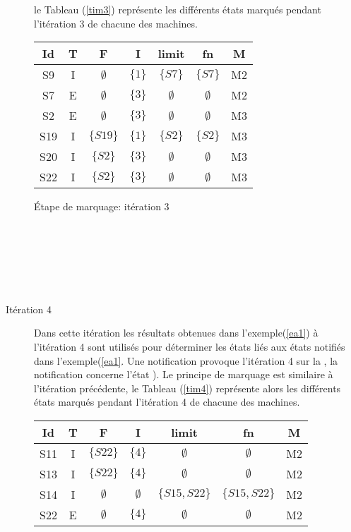 \begin{Exemple}
\begin{description}
le Tableau (\ref{tim3}) représente les différents états marqués pendant l'itération 3 de chacune des machines. 
	\begin{tableth}
	\centering
	\begin{tabular}{|*{7}{c|}}
		\hline
		Id&		T&			F&	I&	limit&	fn&		M\\
		\hline
		S9&	I&	$\emptyset$&	$\{1\}$&	$\{S7\}$   &	$\{S7\}$&	M2\\ \hline
		S7&	E&	$\emptyset$&	$\{3\}$&	$\emptyset$& $\emptyset$&	M2\\ \hline
		S2&	E&	$\emptyset$&	$\{3\}$&$\emptyset$& $\emptyset$	&	M3\\ \hline
		S19&I&	$\{S19\}$&	$\{1\}$&$\{S2\}$   & $\{S2\}$	&	M3\\ \hline
		S20&I&	$\{S2\}$&	$\{3\}$&$\emptyset$& $\emptyset$&	M3\\ \hline
		S22&I&	$\{S2\}$&	$\{3\}$&$\emptyset$& $\emptyset$&	M3\\ \hline
		
	\end{tabular}
	\caption{Étape de marquage: itération 3}\label{tim3}
\end{tableth}
\\\\\\\\\\
	\item[Itération 4] Dans cette itération les résultats obtenues dans l'exemple(\ref{ea1}) à l'itération 4 sont utilisés pour déterminer les états liés aux états notifiés dans l'exemple(\ref{ea1}. Une notification provoque l'itération 4 sur la \mtwo{}, la notification concerne l'état ). Le principe de marquage est similaire à l'itération précédente, le Tableau (\ref{tim4}) représente alors les différents états marqués pendant l'itération 4 de chacune des machines. 
	\begin{tableth}
	\centering
	\begin{tabular}{|*{7}{c|}}
		\hline
		Id&		T&			F&	I&	limit&	fn&		M\\
		\hline
		S11&	I&	$\{S22\}$	&	$\{4\}$			&$\emptyset$	&$\emptyset$	&M2\\ \hline
		S13&	I&	$\{S22\}$	&	$\{4\}$			&$\emptyset$	&$\emptyset$	&M2\\ \hline
		S14&	I&	$\emptyset$	&$\emptyset$	&	$\{S15,S22\}$	&$\{S15,S22\}$	&M2\\ \hline
		S22&	E&	$\emptyset$	&	$\{4\}$			&$\emptyset$	&$\emptyset$	&M2\\ \hline
		

\end{tabular}
\end{tableth}
\end{description}
\end{Exemple}
